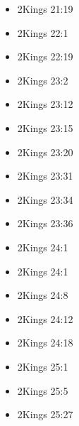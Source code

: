 \documentclass[14pt]{article}
\begin{document}
\begin{multicols}{2}
\begin{itemize}
													\item 2Kings 21:19
													
													\item 2Kings 22:1
													
													\item 2Kings 22:19
													
													\item 2Kings 23:2
													
													\item 2Kings 23:12
													
													\item 2Kings 23:15
													
													\item 2Kings 23:20
													
													\item 2Kings 23:31
													
													\item 2Kings 23:34
													
													\item 2Kings 23:36
													
													\item 2Kings 24:1
													
													\item 2Kings 24:1
													
													\item 2Kings 24:8
													
													\item 2Kings 24:12
													
													\item 2Kings 24:18
													
													\item 2Kings 25:1
													
													\item 2Kings 25:5
													
													\item 2Kings 25:27
\end{itemize}\end{multicols}
\end{document}
